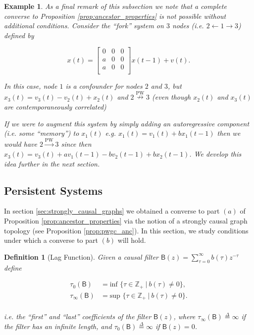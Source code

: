 \documentclass{statsoc}
\def\pwgc{\overset{\text{PW}}{\rightarrow}}  %
\def\npwgc{\overset{\text{PW}}{\nrightarrow}}  %
\def\B{\mathsf{B}}  %
\newtheorem{definition}{Definition}
\newtheorem{example}{Example}
\def\defeq{\overset{\Delta}{=}}  %
\def\Z{\mathbb{Z}}  %
\begin{document}
\begin{example}
  As a final remark of this subsection we note that a complete
  converse to Proposition \ref{prop:ancestor_properties} is not
  possible without additional conditions.  Consider the ``fork''
  system on $3$ nodes (i.e. $2 \leftarrow 1 \rightarrow 3$) defined by

  \begin{equation*}
    x(t) =
    \left[
      \begin{array}{cccc}
        0 & 0 & 0\\
        a & 0 & 0\\
        a & 0 & 0\\
      \end{array}
    \right] x(t - 1) + v(t).
  \end{equation*}

  In this case, node $1$ is a confounder for nodes $2$ and $3$, but
  $x_3(t) = v_3(t) - v_2(t) + x_2(t)$ and $2 \npwgc 3$ (even
  though $x_2(t)$ and $x_3(t)$ are contemporaneously correlated)

  If we were to augment this system by simply adding an autoregressive
  component (i.e. some ``memory'') to $x_1(t)$ e.g.
  $x_1(t) = v_1(t) + b x_1(t - 1)$ then we \textit{would} have
  $2 \pwgc 3$ since then
  $x_3(t) = v_3(t) + av_1(t - 1) - bv_2(t - 1) + bx_2(t - 1)$.  We
  develop this idea further in the next section.
\end{example}

\subsection{Persistent Systems}
\label{sec:persistent_systems}
In section \ref{sec:strongly_causal_graphs} we obtained a converse to
part $(a)$ of Proposition \ref{prop:ancestor_properties} via the
notion of a strongly causal graph topology (see Proposition
\ref{prop:pwgc_anc}).  In this section, we study conditions under
which a converse to part $(b)$ will hold.

\begin{definition}[Lag Function]
  Given a causal filter $\B(z) = \sum_{\tau = 0}^\infty b(\tau)z^{-\tau}$
  define 

  \begin{align}
    \tau_0(\B) &= \text{inf }\{\tau \in \Z_+\ |\ b(\tau) \ne 0\},\\
    \tau_{\infty}(\B) &= \text{sup }\{\tau \in \Z_+\ |\ b(\tau) \ne 0\}.\\
  \end{align}

  i.e. the ``first'' and ``last'' coefficients of the filter $\B(z)$,
  where $\tau_\infty(\B) \defeq \infty$ if the filter has an infinite
  length, and $\tau_0(\B) \defeq \infty$ if $\B(z) = 0$.
\end{definition}
\end{document}
